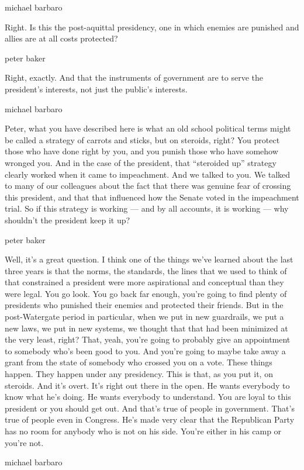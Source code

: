 michael barbaro

Right. Is this the post-aquittal presidency, one in which enemies are
punished and allies are at all costs protected?

peter baker

Right, exactly. And that the instruments of government are to serve the
president's interests, not just the public's interests.

michael barbaro

Peter, what you have described here is what an old school political
terms might be called a strategy of carrots and sticks, but on steroids,
right? You protect those who have done right by you, and you punish
those who have somehow wronged you. And in the case of the president,
that ``steroided up'' strategy clearly worked when it came to
impeachment. And we talked to you. We talked to many of our colleagues
about the fact that there was genuine fear of crossing this president,
and that that influenced how the Senate voted in the impeachment trial.
So if this strategy is working --- and by all accounts, it is working
--- why shouldn't the president keep it up?

peter baker

Well, it's a great question. I think one of the things we've learned
about the last three years is that the norms, the standards, the lines
that we used to think of that constrained a president were more
aspirational and conceptual than they were legal. You go look. You go
back far enough, you're going to find plenty of presidents who punished
their enemies and protected their friends. But in the post-Watergate
period in particular, when we put in new guardrails, we put a new laws,
we put in new systems, we thought that that had been minimized at the
very least, right? That, yeah, you're going to probably give an
appointment to somebody who's been good to you. And you're going to
maybe take away a grant from the state of somebody who crossed you on a
vote. These things happen. They happen under any presidency. This is
that, as you put it, on steroids. And it's overt. It's right out there
in the open. He wants everybody to know what he's doing. He wants
everybody to understand. You are loyal to this president or you should
get out. And that's true of people in government. That's true of people
even in Congress. He's made very clear that the Republican Party has no
room for anybody who is not on his side. You're either in his camp or
you're not.

michael barbaro

